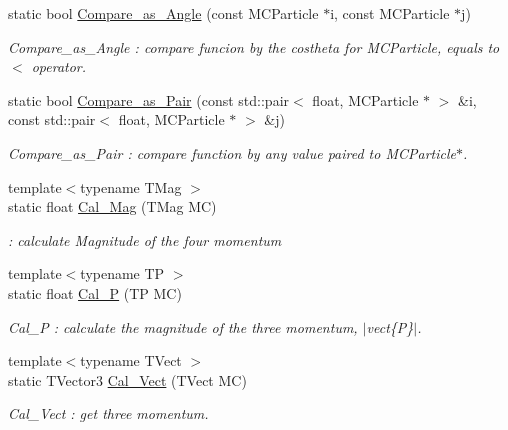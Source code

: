 \begin{DoxyCompactItemize}
static bool \hyperlink{classToolSet_1_1CMC_a4043b9e78a5178c2d8fba7f6543a7e65}{Compare\_\-as\_\-Angle} (const MCParticle $\ast$i, const MCParticle $\ast$j)
\begin{DoxyCompactList}\small\item\em Compare\_\-as\_\-Angle : compare funcion by the costheta for MCParticle, equals to $<$ operator. \item\end{DoxyCompactList}\item 
static bool \hyperlink{classToolSet_1_1CMC_a9840196a2fd81836dfc4118e68d7be38}{Compare\_\-as\_\-Pair} (const std::pair$<$ float, MCParticle $\ast$ $>$ \&i, const std::pair$<$ float, MCParticle $\ast$ $>$ \&j)
\begin{DoxyCompactList}\small\item\em Compare\_\-as\_\-Pair : compare function by any value paired to MCParticle$\ast$. \item\end{DoxyCompactList}\item 
{\footnotesize template$<$typename TMag $>$ }\\static float \hyperlink{classToolSet_1_1CMC_acbada53a8416ca460d7aa07453610dc2}{Cal\_\-Mag} (TMag MC)
\begin{DoxyCompactList}\small\item\em : calculate Magnitude of the four momentum \item\end{DoxyCompactList}\item 
{\footnotesize template$<$typename TP $>$ }\\static float \hyperlink{classToolSet_1_1CMC_ae7f67f1180165cedcc4cbeb4e114e5d1}{Cal\_\-P} (TP MC)
\begin{DoxyCompactList}\small\item\em Cal\_\-P : calculate the magnitude of the three momentum, $|$vect\{P\}$|$. \item\end{DoxyCompactList}\item 
{\footnotesize template$<$typename TVect $>$ }\\static TVector3 \hyperlink{classToolSet_1_1CMC_a679d9af4f1004560f178ed10f1a3028c}{Cal\_\-Vect} (TVect MC)
\begin{DoxyCompactList}\small\item\em Cal\_\-Vect : get three momentum. \item\end{DoxyCompactList}\item 

\end{DoxyCompactItemize}
